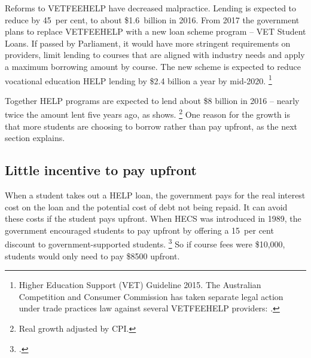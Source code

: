 \documentclass[embargoed]{grattan}
\begin{document}
Reforms to \gls{VETFEEHELP} have decreased malpractice.
Lending is expected to reduce by 45~per cent, to about \$1.6~billion in 2016.
From 2017 the government plans to replace \gls{VETFEEHELP} with a new loan scheme program -- VET Student Loans.
If passed by Parliament, it would have more stringent requirements on providers, limit lending to courses that are aligned with industry needs and apply a maximum borrowing amount by course.
The new scheme is expected to reduce vocational education \gls{HELP} lending by \$2.4 billion a year by mid-2020.%
\footnote{Higher Education Support (VET) Guideline 2015.
The Australian Competition and Consumer Commission has taken separate legal action under trade practices law against several \gls{VETFEEHELP} providers: \textcites{Birmingham2016MediareleaseNew}{ACCC2015ACCCtakesaction}.}

Together \gls{HELP} programs are expected to lend about \$8 billion in 2016 -- nearly twice the amount lent five years ago, as  shows.%
\footnote{Real growth adjusted by \gls{CPI}.} 
One reason for the growth is that more students are choosing to borrow rather than pay upfront, as the next section explains.

\subsection{Little incentive to pay upfront}\label{subsec:little-incentive-to-pay-upfront}

When a student takes out a \gls{HELP} loan, the government pays for the real interest cost on the loan and the potential cost of debt not being repaid.
It can avoid these costs if the student pays upfront.
When \gls{HECS} was introduced in 1989, the government encouraged students to pay upfront by offering a 15~per cent discount to government-supported students.%
\footcite[][79]{Wran1988ReportCommitteeHigher} 
So if course fees were \$10,000, students would only need to pay \$8500 upfront.
\end{document}
